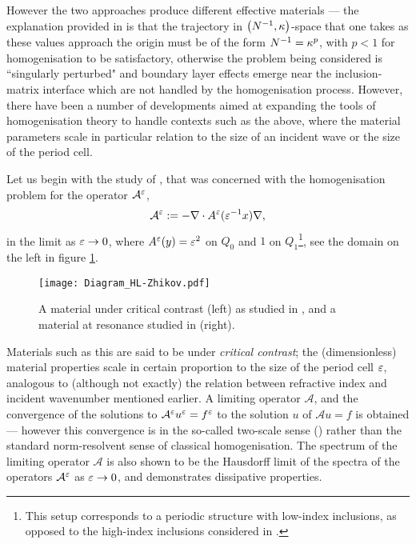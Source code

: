 However the two approaches produce different effective materials --- the explanation provided in \cite{movchan2001noncommuting} is that the trajectory in $\left( N^{-1},\kappa \right)$-space that one takes as these values approach the origin must be of the form $N^{-1}=\kappa^p$, with $p<1$ for homogenisation to be satisfactory, otherwise the problem being considered is ``singularly perturbed" and boundary layer effects emerge near the inclusion-matrix interface which are not handled by the homogenisation process.
However, there have been a number of developments aimed at expanding the tools of homogenisation theory to handle contexts such as the above, where the material parameters scale in particular relation to the size of an incident wave or the size of the period cell.

Let us begin with the study of \cite{zhikov2000extension}, that was concerned with the homogenisation problem for the operator $\mathcal{A}^{\varepsilon}$,
\begin{align*}
	\mathcal{A}^{\varepsilon} := -\nabla\cdot A^{\varepsilon}(\varepsilon^{-1}x)\nabla,
\end{align*}
in the limit as $\varepsilon\rightarrow0$, where $A^{\varepsilon}(y)=\varepsilon^2$ on $Q_0$ and $1$ on $Q_1$\footnote{This setup corresponds to a periodic structure with low-index inclusions, as opposed to the high-index inclusions considered in \cite{movchan2001noncommuting}.}, see the domain on the left in figure \ref{fig:Diagram_HL-Zhikov}.
\begin{figure}[b]
	\centering
	\texttt{[image: Diagram\_HL-Zhikov.pdf]}
	\caption[Relation between materials under critical contrast and at resonance.]{\label{fig:Diagram_HL-Zhikov} A material under critical contrast (left) as studied in \cite{zhikov2000extension}, and a material at resonance studied in \cite{hempel2000spectral} (right).}
\end{figure}
Materials such as this are said to be under \emph{critical contrast}; the (dimensionless) material properties scale in certain proportion to the size of the period cell $\varepsilon$, analogous to (although not exactly) the relation between refractive index and incident wavenumber mentioned earlier.
A limiting operator $\mathcal{A}$, and the convergence of the solutions to $\mathcal{A}^{\varepsilon}u^{\varepsilon}=f^{\varepsilon}$ to the solution $u$ of $\mathcal{A}u=f$ is obtained --- however this convergence is in the so-called two-scale sense (\cite[section 2]{zhikov2000extension}) rather than the standard norm-resolvent sense of classical homogenisation.
The spectrum of the limiting operator $\mathcal{A}$ is also shown to be the Hausdorff limit of the spectra of the operators $\mathcal{A}^{\varepsilon}$ as $\varepsilon\rightarrow0$, and demonstrates dissipative properties.
